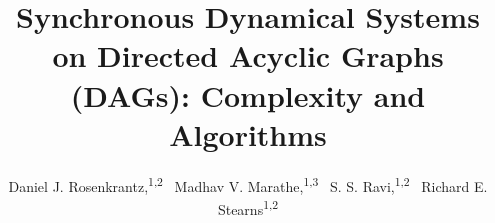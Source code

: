 \documentclass[letterpaper]{article} %
\title{Synchronous Dynamical Systems on Directed Acyclic Graphs (DAGs):\newline
       Complexity and Algorithms
}
\author{
Daniel J. Rosenkrantz,\textsuperscript{\rm 1,2}~
Madhav V. Marathe,\textsuperscript{\rm 1,3}~
S. S. Ravi,\textsuperscript{\rm 1,2}~
Richard E. Stearns\textsuperscript{\rm 1,2} {\medskip}\\
}
\begin{document}

\newtheorem{theorem}{Theorem}[section]
\newtheorem{lemma}{Lemma}[section]
\newtheorem{corollary}{Corollary}[section]
\newtheorem{fact}{Fact}[section]
\newtheorem{definition}{Definition}[section]
\newtheorem{proposition}{Proposition}[section]
\newtheorem{observation}{Observation}[section]
\newtheorem{claim}{Claim}[section]

\newcommand{\true}{\texttt{True}}
\newcommand{\false}{\texttt{False}}

\newcommand{\QED}{\hfill\rule{2mm}{2mm}}

\newcommand{\irange}{\mbox{$1 \leq i \leq n$}}
\newcommand{\jrange}{\mbox{$1 \leq j \leq m$}}

\newcommand{\dunder}[1]{\underline{\underline{#1}}}

\newcommand{\bbb}{\mbox{$\mathbb{B}$}}

\newcommand{\cals}{\mbox{$\mathcal{S}$}}
\newcommand{\calc}{\mbox{$\mathcal{C}$}}
\newcommand{\cali}{\mbox{$\mathcal{I}$}}
\newcommand{\calcp}{\mbox{$\mathcal{C'}$}}
\newcommand{\cald}{\mbox{$\mathcal{D}$}}
\newcommand{\call}{\mbox{$\mathcal{L}$}}
\newcommand{\calf}{\mbox{$\mathcal{F}$}}

\newcommand{\calco}{\mbox{$\mathcal{C}_{1}$}}
\newcommand{\calcz}{\mbox{$\mathcal{C}_0$}}
\newcommand{\calci}{\mbox{$\mathcal{C}_i$}}
\newcommand{\calcipo}{\mbox{$\mathcal{C}_{i+1}$}}
\newcommand{\calct}{\mbox{$\mathcal{C}_{t}$}}
\newcommand{\calctmo}{\mbox{$\mathcal{C}_{t-1}$}}
\newcommand{\dcare}{\texttt{x}}

\newcommand{\genprob}{\mbox{\textsc{CSC}}}
\newcommand{\pre}{\textsc{Pre}}
\newcommand{\npre}{\textsc{\#Pre}}

\newcommand{\cnp}{\textsf{NP}}
\newcommand{\cconp}{\textsf{Co-NP}}
\newcommand{\cpsp}{\textsf{PSPACE}}

\newcommand{\ourop}{\mbox{$\otimes$}}

\maketitle

\begin{abstract}

\end{abstract}

\setcounter{footnote}{3}




\end{document}
